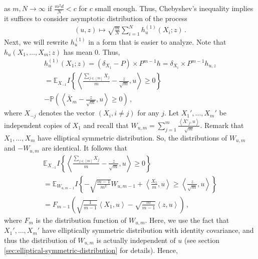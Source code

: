 \documentclass[12pt]{article}
\def\l{\left}
\def\r{\right}
\newcommand{\mb}{\mathbb}
\newcommand{\pr}[1]{\mathbb{P}{\left(#1\right)}}
\newcommand{\dotp}[2]{\left\langle#1,#2\right\rangle}
\newcommand{\scolor}[1]{\textcolor{red}{#1}} %
\theoremstyle{thmstyletwo}%
\theoremstyle{thmstylethree}%
\begin{document}
as $m,N \rightarrow \infty$ if $\frac{m^2d}{N} < c$ for $c$ small enough. Thus, Chebyshev's inequality implies it suffices to consider asymptotic distribution of the process
\begin{align*}
    (u,z) \mapsto \sqrt{\frac{m}{N}} \sum_{i=1}^N h^{(1)}_{u}\l(X_i;z\r)\,.
\end{align*}
Next, we will rewrite $h^{(1)}_{u}$ in a form that is easier to analyze. Note that $h_{u}(X_1, \ldots ,X_m;z)$ has mean $0$. Thus,
    \begin{multline*}
        h^{(1)}_{u} (X_1;z) = (\delta_{X_1} - P) \times P^{m-1} h = \delta_{X_i} \times  P^{m-1} h_{u,z} \\
        = \mb E_{X_{-1}} I\left\{ \dotp{\frac{\sum_{j \in [m]}X_j}{m}-\frac{z}{\sqrt{m}}}{u}\geq 0\right\} \\
        - \pr{\dotp{\bar X_m -\frac{z}{\sqrt{m}}}{u}\geq 0}\,,
    \end{multline*}
    where $X_{-j}$ denotes the vector $(X_i, i \neq j)$ for any $j$. 
    Let $X_1', \ldots, X_{m}'$ be independent copies of $X_1$ and recall that $W_{u,m} = \sum_{j=1}^{m} \frac{\dotp{X'_j}{u}}{\sqrt{m}}$. Remark that $X_1, \ldots, X_m$ have elliptical symmetric distribution. So, the distributions of $W_{u,m}$ and $-W_{u,m}$ are identical. It follows that 
    \begin{multline*}
        \mb E_{X_{-1}} I\left\{ \dotp{\frac{\sum_{j \in [m]}X_j}{m}  -\frac{z}{\sqrt{m}}}{u}\geq 0\right\} \\
        = \mb E_{W_{u,m-1}} I\left\{-\sqrt{\frac{m-1}{m^2}}W_{u,m-1} + \dotp{\frac{X_1}{m}}{u} \geq \dotp{\frac{z}{\sqrt{m}}}{u}\right\} \\
        = F_{m-1}\left(\sqrt{\frac{1}{m-1}}\dotp{X_1}{u} - \sqrt{\frac{m}{m-1}}\dotp{z}{u} \right)\,,
    \end{multline*}
    where $F_{m}$ is the distribution function of $W_{u,m}$. 
    Here, we use the fact that $X_1', \ldots, X_m'$ have elliptically symmetric distribution with identity covariance, and thus the distribution of $W_{u,m}$ is actually independent of $u$ (see section \ref{sec:elliptical-symmetric-distribution} for details). Hence,
\end{document}
